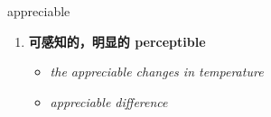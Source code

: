 
\begin{frame}
{\huge appreciable}
\begin{center}
\begin{enumerate}\Large
  \item \textbf{可感知的，明显的 perceptible}
  \begin{itemize}
    \item \em{\Large{the appreciable changes in temperature}}
    \item \em{\Large{appreciable difference}}
  \end{itemize}
\end{enumerate}
\end{center}
\end{frame}
